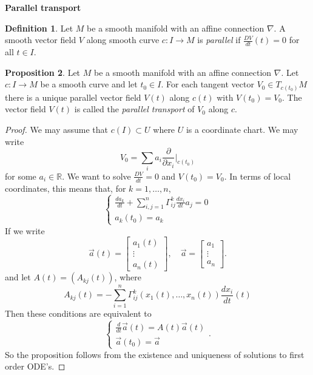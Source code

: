 \documentclass{amsart}
\numberwithin{equation}{section}
\newcommand{\bR}{\mathbb{R}}
\theoremstyle{definition}
\newtheorem{definition}{Definition} [section]
\theoremstyle{theorem}
\newtheorem{proposition}[definition]{Proposition}
\begin{document}
\bigskip

\noindent
{\bf \large Parallel transport}


\begin{definition}
Let $M$ be a smooth manifold with an affine connection $\nabla$. A smooth vector field $V$ along
smooth curve $c: I\to M$ is {\em parallel} if $\frac{DV}{dt}(t)=0$ for all $t\in I$.
\end{definition}

\begin{proposition}
Let $M$ be a smooth manifold with an affine connection $\nabla$. Let $c : I \to M$ be a smooth curve and let $t_0 \in I$. For each tangent vector $V_0 \in T_{c(t_0)} M$ there is a unique parallel vector field
$V(t)$ along $c(t)$ with $V(t_0) = V_0$. 
The vector field $V(t)$ is called the {\em parallel transport} of $V_0$ along $c$. 
\end{proposition}

\begin{proof}
We may assume that $c(I) \subset U$ where $U$ is a coordinate chart. We may write 
\[
V_0 = \sum_{i} a_i \frac{\partial}{\partial x_i}|_{c(t_0)}
\]
for some $a_i\in \bR$. We want to solve $\frac{DV}{dt} = 0$ and $V(t_0) = V_0$. In terms of local coordinates, this means that, for $k=1,\ldots,n$,
\[
\begin{cases}
\displaystyle{\frac{da_k}{dt} + \sum_{i,j=1}^n \Gamma_{ij}^k \frac{dx_i}{dt}a_j = 0} \\
a_k(t_0) = a_k
\end{cases}
\]
If we write 
$$
\vec{a}(t) = \left[\begin{array}{c} a_1(t)\\ \vdots \\ a_n(t)\end{array}\right],
\quad \vec{a}=\left[\begin{array}{c} a_1\\ \vdots \\a_n\end{array}\right].
$$
and let $A(t)=(A_{kj}(t))$, where
$$
A_{kj}(t) = -\sum_{i=1}^n \Gamma_{ij}^k (x_1(t),\ldots, x_n(t)) 
\frac{d x_i}{d t}(t)
$$
Then these conditions are equivalent to 
\[
\begin{cases}
\frac{d}{dt}\vec{a}(t) = A(t)\vec{a}(t) \\
\vec{a}(t_0) = \vec{a}
\end{cases}.
\]
So the proposition follows from the existence and uniqueness of solutions to first order ODE's. 
\end{proof}
\end{document}
